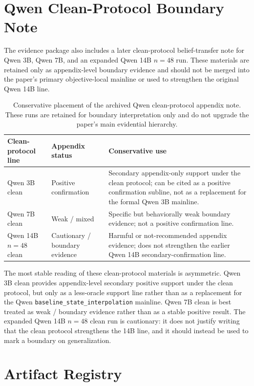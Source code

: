 \documentclass[11pt]{article}
\begin{document}
\section{Qwen Clean-Protocol Boundary Note}

The evidence package also includes a later clean-protocol belief-transfer note for Qwen 3B, Qwen 7B, and an expanded Qwen 14B \(n=48\) run.
These materials are retained only as appendix-level boundary evidence and should not be merged into the paper's primary objective-local mainline or used to strengthen the original Qwen 14B line.

\begin{table}[h]
  \centering
  \small
  \begin{tabular}{p{1.3in}p{1.4in}p{3.2in}}
    \toprule
    Clean-protocol line & Appendix status & Conservative use \\
    \midrule
    Qwen 3B clean & Positive confirmation & Secondary appendix-only support under the clean protocol; can be cited as a positive confirmation subline, not as a replacement for the formal Qwen 3B mainline. \\
    Qwen 7B clean & Weak / mixed & Specific but behaviorally weak boundary evidence; not a positive confirmation line. \\
    Qwen 14B \(n=48\) clean & Cautionary / boundary evidence & Harmful or not-recommended appendix evidence; does not strengthen the earlier Qwen 14B secondary-confirmation line. \\
    \bottomrule
  \end{tabular}
  \caption{Conservative placement of the archived Qwen clean-protocol appendix note. These runs are retained for boundary interpretation only and do not upgrade the paper's main evidential hierarchy.}
  \label{tab:appendix_qwen_clean_protocol}
\end{table}

The most stable reading of these clean-protocol materials is asymmetric.
Qwen 3B clean provides appendix-level secondary positive support under the clean protocol, but only as a less-oracle support line rather than as a replacement for the Qwen \texttt{baseline\_state\_interpolation} mainline.
Qwen 7B clean is best treated as weak / boundary evidence rather than as a stable positive result.
The expanded Qwen 14B \(n=48\) clean run is cautionary: it does not justify writing that the clean protocol strengthens the 14B line, and it should instead be used to mark a boundary on generalization.

\section{Artifact Registry}
\end{document}
